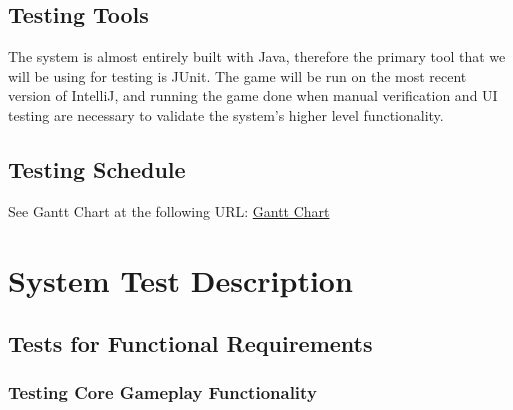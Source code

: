 \documentclass[12pt, titlepage]{article}
\begin{document}
\subsection{Testing Tools}

The system is almost entirely built with Java, therefore the primary tool that we will be using for testing is JUnit. The game will be run on the most recent version of IntelliJ, and running the game done when manual verification and UI testing are necessary to validate the system's higher level functionality.

\subsection{Testing Schedule}

See Gantt Chart at the following URL:
\href{run:././ProjectSchedule/sketchysupermariobros.gan}{Gantt Chart}

\section{System Test Description}

\subsection{Tests for Functional Requirements}

\subsubsection{Testing Core Gameplay Functionality}
		
\end{document}
